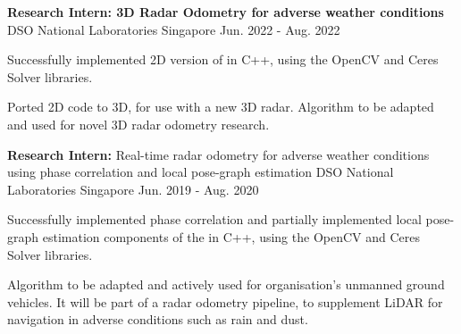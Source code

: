 


\begin{cventries}


\label{radarSLAM}

\cventry
{
    \textbf{Research Intern: 3D Radar Odometry for adverse weather conditions} 
} %
{DSO National Laboratories} %
{Singapore} %
{Jun. 2022 - Aug. 2022} %
{ %
    \begin{cvitems}
        \item { Successfully implemented 2D version of  in C++, using the OpenCV and Ceres Solver libraries.}
        \item { Ported 2D code to 3D, for use with a new 3D radar. Algorithm to be adapted and used for novel 3D radar odometry research. }
    \end{cvitems}
}



\label{radarOdometry}

\cventry
{
	\textbf{Research Intern:} Real-time radar odometry for adverse weather conditions using phase correlation and local pose-graph estimation
} %
{DSO National Laboratories} %
{Singapore} %
{Jun. 2019 - Aug. 2020} %
{ %
	\begin{cvitems}
		\item { Successfully implemented phase correlation and partially implemented local pose-graph estimation components of the  in C++, using the OpenCV and Ceres Solver libraries.}
		\item { Algorithm to be adapted and actively used for organisation's unmanned ground vehicles. It will be part of a radar odometry pipeline, to supplement LiDAR for navigation in adverse conditions such as rain and dust. }
	\end{cvitems}
}


\end{cventries}
